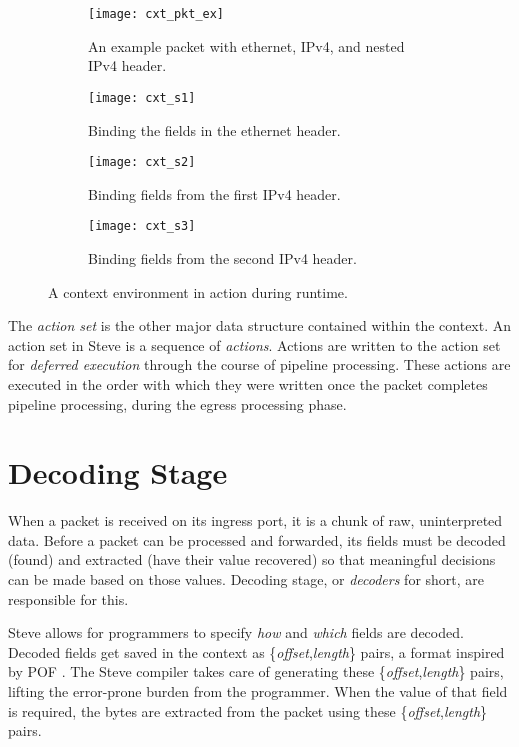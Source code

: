 \begin{figure}[ht]
\begin{subfigure}[t]{.45\textwidth}
  \centering
  \texttt{[image: cxt\_pkt\_ex]}
  \caption{An example packet with ethernet, IPv4, and nested IPv4 header.}
  \label{fg:view1}
\end{subfigure}%
\hfill
\begin{subfigure}[t]{.45\textwidth}
  \centering
  \texttt{[image: cxt\_s1]}
  \caption{Binding the fields in the ethernet header.}
  \label{fg:view2}
\end{subfigure}

\begin{subfigure}[t]{.45\textwidth}
  \centering
  \texttt{[image: cxt\_s2]}
  \caption{Binding fields from the first IPv4 header.}
  \label{fg:view3}
\end{subfigure}%
\hfill
\begin{subfigure}[t]{.45\textwidth}
  \centering
  \texttt{[image: cxt\_s3]}
  \caption{Binding fields from the second IPv4 header.}
  \label{fg:view4}
\end{subfigure}
\caption{A context environment in
action during runtime.} \label{fg:ContextEnvWorking} 
\end{figure}

The \textit{action set} is the other major data structure contained within the
context. An action set in Steve is a sequence of \textit{actions}. Actions are written to the action set for \textit{deferred execution}
through the course of pipeline processing. These actions are executed in the order with which they were written once the
packet completes pipeline processing, during the egress processing phase.

\section{Decoding Stage} \label{decoder_desc}

When a packet is received on its ingress port, it is a chunk of raw,
uninterpreted data. Before a packet can be processed and forwarded, its
fields must be decoded (found) and extracted (have their value recovered) so that meaningful decisions can be made
based on those values. Decoding stage, or \textit{decoders} for short, are
responsible for this.

Steve allows for programmers to specify \textit{how} and \textit{which} fields
are decoded. Decoded fields get saved in the context as \{\textit{offset},\textit{length}\} pairs, a
format inspired by POF \cite{pof, pof_fis, pof_impl}. The Steve compiler takes
care of generating these \{\textit{offset},\textit{length}\} pairs, lifting the error-prone burden
from the programmer. When the value of that field is required, the bytes are
extracted from the packet using these \{\textit{offset},\textit{length}\} pairs.

